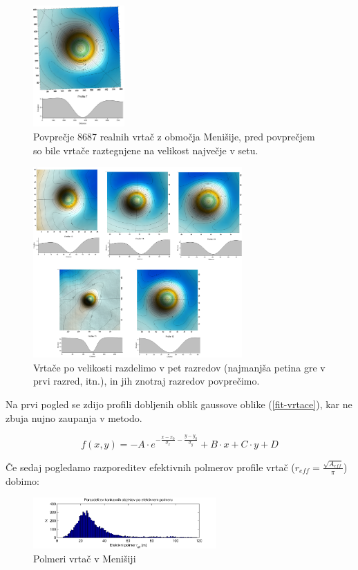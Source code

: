 \documentclass[a4paper, oneside, 12pt]{book}
\begin{document}
\begin{figure}[H]
  \centering
  \includegraphics[width=3.5cm]{slike/vrtaca-menisija}
  \caption{Povprečje 8687 realnih vrtač z območja Menišije, pred povprečjem so bile vrtače raztegnjene na velikost največje v setu.}
  \label{fig:menisija-vrtaca}
\end{figure}

\begin{figure}[H]
  \centering
  \includegraphics[width=8cm]{slike/vrtace-po-razredih-menisija}
  \caption{Vrtače po velikosti razdelimo v pet razredov (najmanjša petina gre v prvi razred, itn.), in jih znotraj razredov povprečimo.}
  \label{fig:menisija-vrtace-po-razredih}
 \end{figure}

 Na prvi pogled se zdijo profili dobljenih oblik gaussove oblike (\ref{fit-vrtace}), kar ne zbuja nujno zaupanja v metodo.

\begin{equation}
  f(x,y) = - A \cdot e^{-\frac{x-x_0}{\sigma_x}-\frac{y-y_0}{\sigma_y}} + B \cdot x + C \cdot y + D  
  \label{fit-vrtace}
\end{equation}

Če sedaj pogledamo razporeditev efektivnih polmerov profile vrtač (\mbox{$r_{eff}=\frac{\sqrt{A_{eff}}}{\pi}$}) dobimo:

\begin{figure}[H]
  \centering
  \includegraphics[width=7cm]{slike/menisija-polmeri-hist}
  \caption{Polmeri vrtač v Menišiji}
  \label{fig:menisija-polmeri-hist}
\end{figure}
\end{document}

